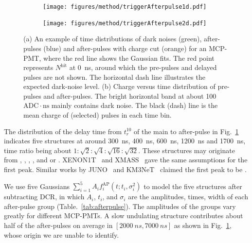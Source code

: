 \begin{figure}[!htbp]
    \centering
    \begin{subfigure}[t]{\LF\textwidth}
        \texttt{[image: figures/method/triggerAfterpulse1d.pdf]}
        \caption{}%
        \label{fig:afterpulse1d}
    \end{subfigure}
    \begin{subfigure}[t]{\LF\textwidth}
        \texttt{[image: figures/method/triggerAfterpulse2d.pdf]}
        \caption{}
        \label{fig:afterpulse2d}
    \end{subfigure}
    \caption{(a) An example of time distributions of dark noises (green), after-pulses (blue) and after-pulses with charge cut (orange) for an MCP-PMT, where the red line shows the Gaussian fits. The red point represents $N^{\mathrm{hit}}$ at \SI{0}{ns}, around which the pre-pulses and delayed pulses are not shown. The horizontal dash line illustrates the expected dark-noise level. (b) Charge versus time distribution of pre-pulses and after-pulses. The bright horizontal band at about 100\,$\mathrm{ADC}\cdot \mathrm{ns}$ mainly contains dark noise. The black (dash) line is the mean charge of (selected) pulses in each time bin.}
\end{figure}

The distribution of the delay time from $t_r^{10}$ of the main to after-pulse in Fig.~\ref{fig:afterpulse1d} indicates five structures at around \SI{300}{ns}, \SI{400}{ns}, \SI{600}{ns}, \SI{1200}{ns} and \SI{1700}{ns}, time ratio being about $1:\sqrt{2}:\sqrt{4}:\sqrt{16}:\sqrt{32}$. These structures may originate from , , , , and  or . XENON1T~\cite{XENON1TTesting} and XMASS~\cite{Abe_2020} gave the same assumptions for the first peak. Similar works by JUNO~\cite{Zhao:2022gks} and KM3NeT~\cite{KM3NetTesting} claimed the first peak to be .

We use five Gaussians $\sum_{i=1}^{5}{A_if_i^{\mathrm{AP}}(t;t_i,\sigma_i^2)}$ to model the five structures after subtracting DCR, in which $A_i$, $t_i$, and $\sigma_i$ are the amplitudes, times, width of each after-pulse group (Table.~\ref{tab:afterpulse}). The amplitudes of the groups vary greatly for different MCP-PMTs.  A slow undulating structure contributes about half of the after-pulses on average in $[\SI{2000}{ns},\SI{7000}{ns}]$ as shown in Fig.~\ref{fig:afterpulse1d}, whose origin we are unable to identify.

